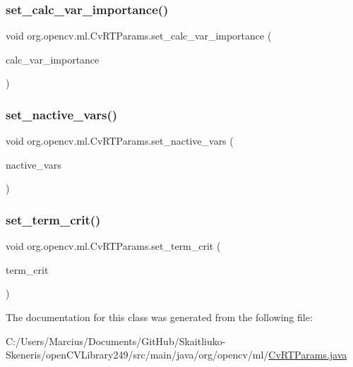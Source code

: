 \subsubsection{\texorpdfstring{set\+\_\+calc\+\_\+var\+\_\+importance()}{set\_calc\_var\_importance()}}
{\footnotesize\ttfamily void org.\+opencv.\+ml.\+Cv\+R\+T\+Params.\+set\+\_\+calc\+\_\+var\+\_\+importance (\begin{DoxyParamCaption}\item[{boolean}]{calc\+\_\+var\+\_\+importance }\end{DoxyParamCaption})}

\mbox{\label{classorg_1_1opencv_1_1ml_1_1_cv_r_t_params_a1860043aa9f6811b1e842486251e5bb1}} 
\subsubsection{\texorpdfstring{set\+\_\+nactive\+\_\+vars()}{set\_nactive\_vars()}}
{\footnotesize\ttfamily void org.\+opencv.\+ml.\+Cv\+R\+T\+Params.\+set\+\_\+nactive\+\_\+vars (\begin{DoxyParamCaption}\item[{int}]{nactive\+\_\+vars }\end{DoxyParamCaption})}

\mbox{\label{classorg_1_1opencv_1_1ml_1_1_cv_r_t_params_a4bd98b6240d83fd415b87102b55f7909}} 
\subsubsection{\texorpdfstring{set\+\_\+term\+\_\+crit()}{set\_term\_crit()}}
{\footnotesize\ttfamily void org.\+opencv.\+ml.\+Cv\+R\+T\+Params.\+set\+\_\+term\+\_\+crit (\begin{DoxyParamCaption}\item[{\mbox{\hyperlink{classorg_1_1opencv_1_1core_1_1_term_criteria}{Term\+Criteria}}}]{term\+\_\+crit }\end{DoxyParamCaption})}



The documentation for this class was generated from the following file\+:\begin{DoxyCompactItemize}
\item 
C\+:/\+Users/\+Marcius/\+Documents/\+Git\+Hub/\+Skaitliuko-\/\+Skeneris/open\+C\+V\+Library249/src/main/java/org/opencv/ml/\mbox{\hyperlink{_cv_r_t_params_8java}{Cv\+R\+T\+Params.\+java}}\end{DoxyCompactItemize}
